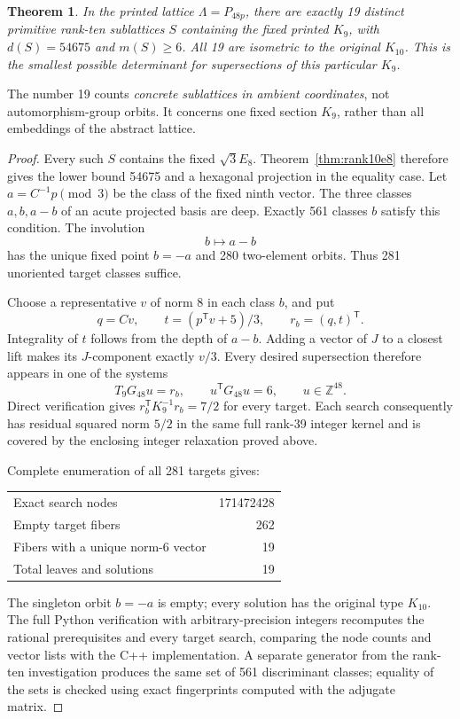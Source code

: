 \documentclass[11pt,a4paper]{article}
\newtheorem{theorem}{Theorem}[section]
\theoremstyle{remark}\newtheorem{remark}[theorem]{Remark}
\newcommand{\Z}{\mathbb Z}\newcommand{\R}{\mathbb R}\newcommand{\F}{\mathbb F}
\begin{document}
\begin{theorem}\label{thm:nineteen}
In the printed lattice $\Lambda=P_{48p}$, there are exactly 19 distinct primitive rank-ten sublattices $S$ containing the fixed printed $K_9$, with $d(S)=54675$ and $m(S)\ge6$. All 19 are isometric to the original $K_{10}$. This is the smallest possible determinant for supersections of this particular $K_9$.
\end{theorem}

The number 19 counts \emph{concrete sublattices in ambient coordinates}, not automorphism-group orbits. It concerns one fixed section $K_9$, rather than all embeddings of the abstract lattice.

\begin{proof}
Every such $S$ contains the fixed $\sqrt3E_8$. Theorem~\ref{thm:rank10e8} therefore gives the lower bound 54675 and a hexagonal projection in the equality case. Let $a=C^{-1}p\pmod3$ be the class of the fixed ninth vector. The three classes $a,b,a-b$ of an acute projected basis are deep. Exactly 561 classes $b$ satisfy this condition. The involution
\[
b\longmapsto a-b
\]
has the unique fixed point $b=-a$ and 280 two-element orbits. Thus 281 unoriented target classes suffice.

Choose a representative $v$ of norm 8 in each class $b$, and put
\[
q=Cv,\qquad t=(p^{\mathsf T}v+5)/3,\qquad r_b=(q,t)^{\mathsf T}.
\]
Integrality of $t$ follows from the depth of $a-b$. Adding a vector of $J$ to a closest lift makes its $J$-component exactly $v/3$. Every desired supersection therefore appears in one of the systems
\[
T_9G_{48}u=r_b,\qquad u^{\mathsf T}G_{48}u=6,\qquad u\in\Z^{48}.
\]
Direct verification gives $r_b^{\mathsf T}K_9^{-1}r_b=7/2$ for every target. Each search consequently has residual squared norm $5/2$ in the same full rank-39 integer kernel and is covered by the enclosing integer relaxation proved above.

Complete enumeration of all 281 targets gives:
\begin{center}
\begin{tabular}{lr}
\toprule
Exact search nodes &171472428\\
Empty target fibers &262\\
Fibers with a unique norm-6 vector &19\\
Total leaves and solutions &19\\
\bottomrule
\end{tabular}
\end{center}
The singleton orbit $b=-a$ is empty; every solution has the original type $K_{10}$. The full Python verification with arbitrary-precision integers recomputes the rational prerequisites and every target search, comparing the node counts and vector lists with the C++ implementation. A separate generator from the rank-ten investigation produces the same set of 561 discriminant classes; equality of the sets is checked using exact fingerprints computed with the adjugate matrix.


\end{proof}
\end{document}
